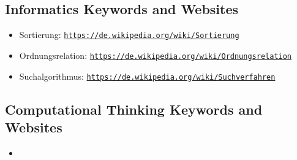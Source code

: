 \documentclass[a4paper,11pt]{report}
\newcommand{\BrochureUrlText}[1]{\texttt{#1}}
\begin{document}
\subsection*{Informatics Keywords and Websites}

\begin{itemize}
  \item Sortierung: \href{https://de.wikipedia.org/wiki/Sortierung}{\BrochureUrlText{https://de.wikipedia.org/wiki/Sortierung}}
  \item Ordnungsrelation: \href{https://de.wikipedia.org/wiki/Ordnungsrelation}{\BrochureUrlText{https://de.wikipedia.org/wiki/Ordnungsrelation}}
  \item Suchalgorithmus: \href{https://de.wikipedia.org/wiki/Suchverfahren}{\BrochureUrlText{https://de.wikipedia.org/wiki/Suchverfahren}}
\end{itemize}


\subsection*{Computational Thinking Keywords and Websites}

\begin{itemize}
  \item 
\end{itemize}
\end{document}
